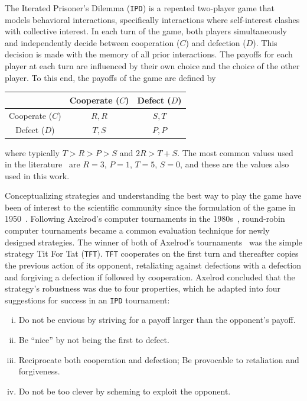 \documentclass{article}
\def\TFT{\texttt{TFT}}
\def\IPD{\texttt{IPD}}
\begin{document}
The Iterated Prisoner's Dilemma (\IPD) is a repeated two-player game that models
behavioral interactions, specifically interactions where self-interest clashes
with collective interest. In each turn of the game, both players simultaneously
and independently decide between cooperation (\(C\)) and defection (\(D\)). This
decision is made with the memory of all prior interactions. The payoffs for each
player at each turn are influenced by their own choice and the choice of the
other player. To this end, the payoffs of the game are defined by

\begin{center}
{\renewcommand{\arraystretch}{2}%
\begin{tabular}{c|c|c}
& Cooperate (\(C\)) & Defect (\(D\)) \\
\hline
Cooperate (\(C\)) & \(R, R\) & \(S, T\) \\
\hline
Defect (\(D\)) & \(T, S\) & \(P, P\) \\
\end{tabular}}
\end{center}

where typically \(T > R > P > S\) and \(2R > T + S\). The most common values
used in the literature~\cite{Axelrod1981} are \(R=3\), \(P=1\), \(T=5\),
\(S=0\), and these are the values also used in this work.

Conceptualizing strategies and understanding the best way to play the game have
been of interest to the scientific community since the formulation of the game
in 1950~\cite{Flood1958}. Following Axelrod's computer tournaments in the
1980s~\cite{Axelrod1980a, Axelrod1980b}, round-robin computer tournaments became
a common evaluation technique for newly designed strategies.
The winner of both of Axelrod's tournaments~\cite{Axelrod1980a, Axelrod1980b}
was the simple strategy Tit For Tat (\TFT{}). \TFT{} cooperates on the first turn
and thereafter copies the previous action of its opponent, retaliating against
defections with a defection and forgiving a defection if followed by
cooperation. Axelrod concluded that the strategy's robustness was due to four
properties, which he adapted into four suggestions for success in an \IPD{}
tournament:

\begin{enumerate}[(i)]
    \item Do not be envious by striving for a payoff larger than the opponent's payoff.
    \item Be ``nice'' by not being the first to defect.
    \item Reciprocate both cooperation and defection; Be provocable to retaliation and forgiveness.
    \item Do not be too clever by scheming to exploit the opponent.
\end{enumerate}
\end{document}
